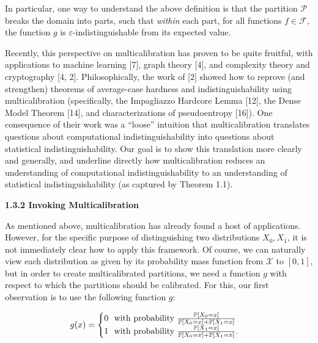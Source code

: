 \documentclass[10pt,a4paper]{article}
\begin{document}



In particular, one way to understand the above definition is that the partition $\mathcal{P}$ breaks the domain into parts, such that \emph{within} each part, for all functions $f\in\mathcal{F}$, the function $g$ is $\varepsilon$-indistinguishable from its expected value.\par




Recently, this perspective on multicalibration has proven to be quite fruitful, with applications to machine learning [7], graph theory [4], and complexity theory and cryptography [4, 2]. Philosophically, the work of [2] showed how to reprove (and strengthen) theorems of average-case hardness and indistinguishability using multicalibration (specifically, the Impagliazzo Hardcore Lemma [12], the Dense Model Theorem [14], and characterizations of pseudoentropy [16]). One consequence of their work was a “loose” intuition that multicalibration translates questions about computational indistinguishability into questions about statistical indistinguishability.
Our goal is to show this translation more clearly and generally, and underline directly how multicalibration reduces an understanding of computational indistinguishability to an understanding of statistical indistinguishability (as captured by Theorem 1.1).\par





\par\medskip\noindent\textbf{
1.3.2 Invoking Multicalibration}\par




As mentioned above, multicalibration has already found a host of applications. However, for the specific purpose of distinguishing two distributions $X_{0},X_{1}$, it is not immediately clear how to apply this framework. Of course, we can naturally view each distribution as given by its probability mass function from $\mathcal{X}$ to $[0,1]$, but in order to create multicalibrated partitions, we need a function $g$ with respect to which the partitions should be calibrated. For this, our first observation is to use the following function $g$:\par


\[\begin{gathered}
g(x)=\begin{cases}0\nobreak\ \nobreak\ \text{with probability }\frac{\mathbb{P}[X_{0}=x]}{\mathbb{P}[X_{0}=x]+\mathbb{P}[X_{1}=x]}\\
1\nobreak\ \nobreak\ \text{with probability }\frac{\mathbb{P}[X_{1}=x]}{\mathbb{P}[X_{0}=x]+\mathbb{P}[X_{1}=x]}.\end{cases}
\end{gathered}\]
\end{document}

